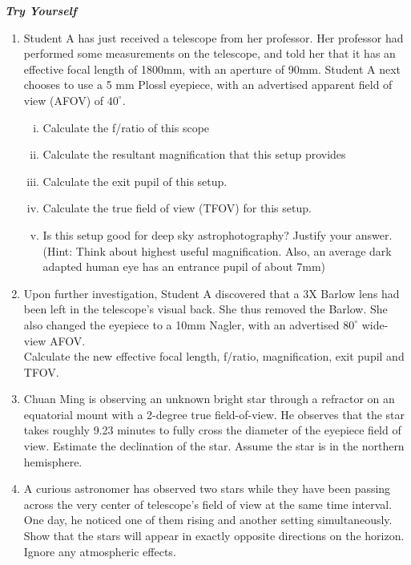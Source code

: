 \documentclass[a4paper,12pt]{extarticle}
\begin{document}
\clearpage
\textbf{\textit{Try Yourself}}
\begin{enumerate}[T1.]	
\item  Student A has just received a telescope from her professor. Her professor had performed some measurements on the telescope, and told her that it has an effective focal length of 1800mm, with an aperture of 90mm. Student A next chooses to use a 5 mm Plossl eyepiece, with an advertised apparent field of view (AFOV) of $40^\circ$.
\begin{enumerate}[i.]
	\item Calculate the f/ratio of this scope
	\item Calculate the resultant magnification that this setup provides
	\item Calculate the exit pupil of this setup.
	\item Calculate the true field of view (TFOV) for this setup.
	\item Is this setup good for deep sky astrophotography? Justify your answer.\\
	(Hint: Think about highest useful magnification. Also, an average dark adapted human eye has an entrance pupil of about 7mm)
\end{enumerate}

\item  Upon further investigation, Student A discovered that a 3X Barlow lens had been left in the telescope’s visual back. She thus removed the Barlow. She also changed the eyepiece to a 10mm Nagler, with an advertised $80^\circ$ wide-view AFOV.\\

Calculate the new effective focal length, f/ratio, magnification, exit pupil and TFOV.

\item Chuan Ming is observing an unknown bright star through a refractor on an equatorial mount with a
2-degree true field-of-view. He observes that the star takes roughly 9.23 minutes to fully cross the
diameter of the eyepiece field of view. Estimate the declination of the star. Assume the star is in the
northern hemisphere.

\item A curious astronomer has observed two stars while they have been passing across the very center of telescope’s field of view at the same time interval. One day, he noticed one of them rising and another setting simultaneously. Show that the stars will appear in exactly opposite directions on the horizon. Ignore any atmospheric effects.
\end{enumerate}
\end{document}
